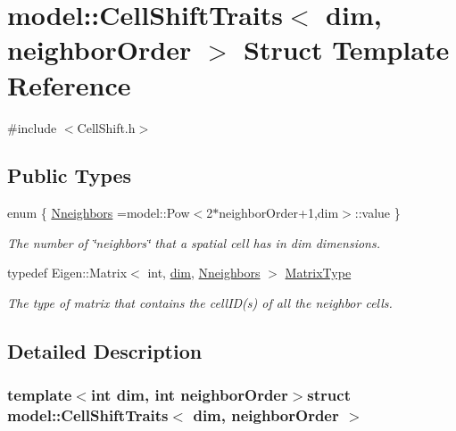 \hypertarget{structmodel_1_1_cell_shift_traits}{}\section{model\+:\+:Cell\+Shift\+Traits$<$ dim, neighbor\+Order $>$ Struct Template Reference}
\label{structmodel_1_1_cell_shift_traits}


{\ttfamily \#include $<$Cell\+Shift.\+h$>$}

\subsection*{Public Types}
\begin{DoxyCompactItemize}
\item 
enum \{ \hyperlink{structmodel_1_1_cell_shift_traits_ad08d385061a729c0cb44dbcfbd516b75a786ab6aa5e0cb1e579485e93d8d91f13}{Nneighbors} =model\+:\+:Pow$<$2$\ast$neighbor\+Order+1,dim$>$\+:\+:value
 \}
\begin{DoxyCompactList}\small\item\em The number of \char`\"{}neighbors\char`\"{} that a spatial cell has in dim dimensions. \end{DoxyCompactList}\item 
typedef Eigen\+::\+Matrix$<$ int, \hyperlink{plot_nd_a_8m_a382f3ca768b275b8d563604f7fc7df73}{dim}, \hyperlink{structmodel_1_1_cell_shift_traits_ad08d385061a729c0cb44dbcfbd516b75a786ab6aa5e0cb1e579485e93d8d91f13}{Nneighbors} $>$ \hyperlink{structmodel_1_1_cell_shift_traits_a1d6b1b4457ac8912cf28783f40c344a3}{Matrix\+Type}
\begin{DoxyCompactList}\small\item\em The type of matrix that contains the cell\+I\+D(s) of all the neighbor cells. \end{DoxyCompactList}\end{DoxyCompactItemize}


\subsection{Detailed Description}
\subsubsection*{template$<$int dim, int neighbor\+Order$>$struct model\+::\+Cell\+Shift\+Traits$<$ dim, neighbor\+Order $>$}

